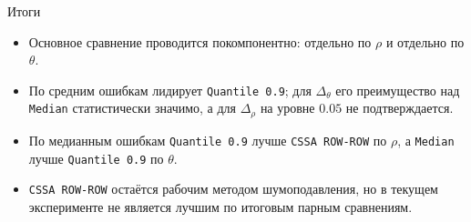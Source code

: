 \documentclass[unicode,notheorems]{beamer}
\begin{document}
%
%

\begin{frame}{Итоги}
	\begin{itemize}
		\item Основное сравнение проводится покомпонентно: отдельно по $\rho$ и отдельно по $\theta$.
		\item По средним ошибкам лидирует \texttt{Quantile 0.9}; для $\Delta_\theta$ его преимущество над \texttt{Median} статистически значимо, а для $\Delta_\rho$ на уровне $0.05$ не подтверждается.
		\item По медианным ошибкам \texttt{Quantile 0.9} лучше \texttt{CSSA ROW-ROW} по $\rho$, а \texttt{Median} лучше \texttt{Quantile 0.9} по $\theta$.
		\item \texttt{CSSA ROW-ROW} остаётся рабочим методом шумоподавления, но в текущем эксперименте не является лучшим по итоговым парным сравнениям.
	\end{itemize}
\end{frame}
\end{document}
